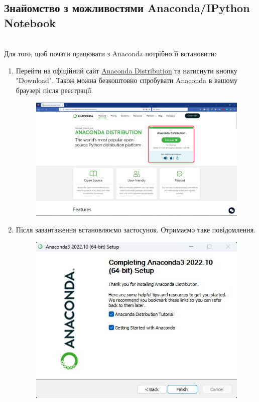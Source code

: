 \documentclass[a4paper,12pt]{article}
\begin{document}
    \subsection {Знайомство з можливостями Anaconda/IPython Notebook}
    \hrulefill \\
    Для того, щоб почати працювати з Anaconda потрібно її встановити:
    \begin{enumerate}
        \item Перейти на офіційний сайт \href{https://www.anaconda.com/products/distribution}{\underline{Anaconda Distribution}} 
        та натиснути кнопку "Download". Також можна безкоштовно спробувати Anaconda в вашому браузері після реєстрації.
        \begin{figure}[h!]
            \begin{center}
                \includegraphics[scale=0.35]{Prt sc/Figure_1.jpg}
            \end{center}
        \end{figure}
        \item Після завантаження встановлюємо застосунок. Отримаємо таке повідомлення.
        \begin{figure}[h!]
            \begin{center}
                \includegraphics[scale=0.8]{Prt sc/Figure_2.jpg}
            \end{center}
        \end{figure}


\end{enumerate}
\end{document}
